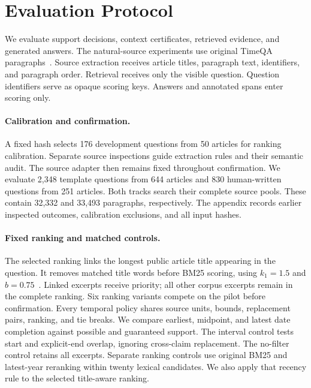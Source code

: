 \section{Evaluation Protocol}
\label{sec:protocol}

We evaluate support decisions, context certificates, retrieved evidence, and generated answers.
The natural-source experiments use original TimeQA paragraphs~\citep{chen2021timeqa}.
Source extraction receives article titles, paragraph text, identifiers, and paragraph order.
Retrieval receives only the visible question.
Question identifiers serve as opaque scoring keys.
Answers and annotated spans enter scoring only.

\paragraph{Calibration and confirmation.}
A fixed hash selects 176 development questions from 50 articles for ranking calibration.
Separate source inspections guide extraction rules and their semantic audit.
The source adapter then remains fixed throughout confirmation.
We evaluate 2,348 template questions from 644 articles and 830 human-written questions from 251 articles.
Both tracks search their complete source pools.
These contain 32,332 and 33,493 paragraphs, respectively.
The appendix records earlier inspected outcomes, calibration exclusions, and all input hashes.

\paragraph{Fixed ranking and matched controls.}
The selected ranking links the longest public article title appearing in the question.
It removes matched title words before BM25 scoring, using $k_1=1.5$ and $b=0.75$~\citep{robertson1995bm25}.
Linked excerpts receive priority; all other corpus excerpts remain in the complete ranking.
Six ranking variants compete on the pilot before confirmation.
Every temporal policy shares source units, bounds, replacement pairs, ranking, and tie breaks.
We compare earliest, midpoint, and latest date completion against possible and guaranteed support.
The interval control tests start and explicit-end overlap, ignoring cross-claim replacement.
The no-filter control retains all excerpts.
Separate ranking controls use original BM25 and latest-year reranking within twenty lexical candidates.
We also apply that recency rule to the selected title-aware ranking.

